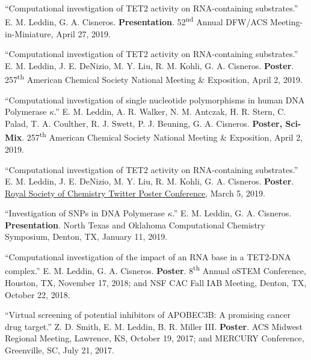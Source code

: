 \documentclass[letterpaper,11pt]{article}
\begin{document}
\begin{etaremune}[start=17]
  \item \textnormal{``Computational investigation of TET2 activity on RNA-containing substrates.'' E. M. Leddin, G. A. Cisneros. \textbf{Presentation}. 52\textsuperscript{nd} Annual DFW/ACS Meeting-in-Miniature, April 27, 2019.}
  \item \textnormal{``Computational investigation of TET2 activity on RNA-containing substrates.'' E. M. Leddin, J. E. DeNizio, M. Y. Liu, R. M. Kohli, G. A. Cisneros. \textbf{Poster}. 257\textsuperscript{th} American Chemical Society National Meeting \& Exposition, April 2, 2019.}
  \item \textnormal{``Computational investigation of single nucleotide polymorphisms in human DNA Polymerase $\kappa$.'' E. M. Leddin, A. R. Walker, N. M. Antczak, H. R. Stern, C. Palad, T. A. Coulther, R. J. Swett, P. J. Beuning, G. A. Cisneros. \textbf{Poster, Sci-Mix}. 257\textsuperscript{th} American Chemical Society National Meeting \& Exposition, April 2, 2019.}
  \item \textnormal{``Computational investigation of TET2 activity on RNA-containing substrates.'' E. M. Leddin, J. E. DeNizio, M. Y. Liu, R. M. Kohli, G. A. Cisneros. \textbf{Poster}. \href{https://twitter.com/EmLedd1/status/1103107933951459333?s=20}{Royal Society of Chemistry Twitter Poster Conference}, March 5, 2019.}
  \item \textnormal{``Investigation of SNPs in DNA Polymerase $\kappa$.'' E. M. Leddin, G. A. Cisneros. \textbf{Presentation}. North Texas and Oklahoma Computational Chemistry Symposium, Denton, TX, January 11, 2019.}
  \item \textnormal{``Computational investigation of the impact of an RNA base in a TET2-DNA complex.'' E. M. Leddin, G. A. Cisneros. \textbf{Poster}. 8\textsuperscript{th} Annual oSTEM Conference, Houston, TX, November 17, 2018; and NSF CAC Fall IAB Meeting, Denton, TX, October 22, 2018.}
  \item \textnormal{``Virtual screening of potential inhibitors of APOBEC3B: A promising cancer drug target.'' Z. D. Smith, E. M. Leddin, B. R. Miller III. \textbf{Poster}. ACS Midwest Regional Meeting, Lawrence, KS, October 19, 2017; and MERCURY Conference, Greenville, SC, July 21, 2017.}

\end{etaremune}
\newpage
\end{document}
